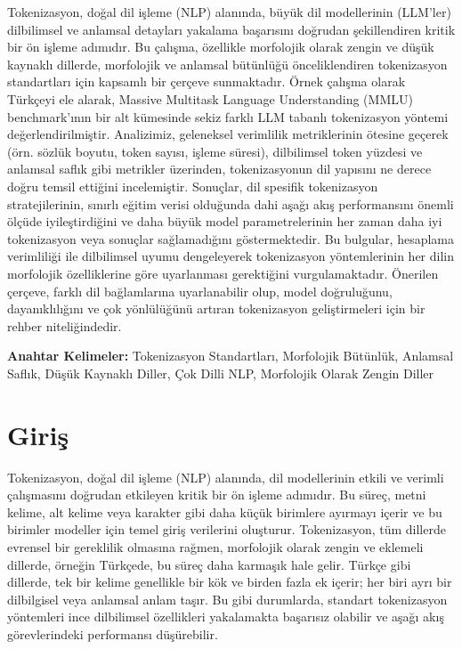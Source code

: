 \documentclass{article}
\begin{document}
\begin{ozet}
  Tokenizasyon, doğal dil işleme (NLP) alanında, büyük dil modellerinin (LLM'ler) dilbilimsel ve anlamsal detayları yakalama başarısını doğrudan şekillendiren kritik bir ön işleme adımıdır. Bu çalışma, özellikle morfolojik olarak zengin ve düşük kaynaklı dillerde, morfolojik ve anlamsal bütünlüğü önceliklendiren tokenizasyon standartları için kapsamlı bir çerçeve sunmaktadır. Örnek çalışma olarak Türkçeyi ele alarak, Massive Multitask Language Understanding (MMLU) benchmark'ının bir alt kümesinde sekiz farklı LLM tabanlı tokenizasyon yöntemi değerlendirilmiştir. Analizimiz, geleneksel verimlilik metriklerinin ötesine geçerek (örn. sözlük boyutu, token sayısı, işleme süresi), dilbilimsel token yüzdesi ve anlamsal saflık gibi metrikler üzerinden, tokenizasyonun dil yapısını ne derece doğru temsil ettiğini incelemiştir. Sonuçlar, dil spesifik tokenizasyon stratejilerinin, sınırlı eğitim verisi olduğunda dahi aşağı akış performansını önemli ölçüde iyileştirdiğini ve daha büyük model parametrelerinin her zaman daha iyi tokenizasyon veya sonuçlar sağlamadığını göstermektedir. Bu bulgular, hesaplama verimliliği ile dilbilimsel uyumu dengeleyerek tokenizasyon yöntemlerinin her dilin morfolojik özelliklerine göre uyarlanması gerektiğini vurgulamaktadır. Önerilen çerçeve, farklı dil bağlamlarına uyarlanabilir olup, model doğruluğunu, dayanıklılığını ve çok yönlülüğünü artıran tokenizasyon geliştirmeleri için bir rehber niteliğindedir.
  
  \textbf{Anahtar Kelimeler:} Tokenizasyon Standartları, Morfolojik Bütünlük, Anlamsal Saflık, Düşük Kaynaklı Diller, Çok Dilli NLP, Morfolojik Olarak Zengin Diller
\end{ozet}

\section{Giriş}

Tokenizasyon, doğal dil işleme (NLP) alanında, dil modellerinin etkili ve verimli çalışmasını doğrudan etkileyen kritik bir ön işleme adımıdır. Bu süreç, metni kelime, alt kelime veya karakter gibi daha küçük birimlere ayırmayı içerir ve bu birimler modeller için temel giriş verilerini oluşturur. Tokenizasyon, tüm dillerde evrensel bir gereklilik olmasına rağmen, morfolojik olarak zengin ve eklemeli dillerde, örneğin Türkçede, bu süreç daha karmaşık hale gelir. Türkçe gibi dillerde, tek bir kelime genellikle bir kök ve birden fazla ek içerir; her biri ayrı bir dilbilgisel veya anlamsal anlam taşır. Bu gibi durumlarda, standart tokenizasyon yöntemleri ince dilbilimsel özellikleri yakalamakta başarısız olabilir ve aşağı akış görevlerindeki performansı düşürebilir.
\end{document}
